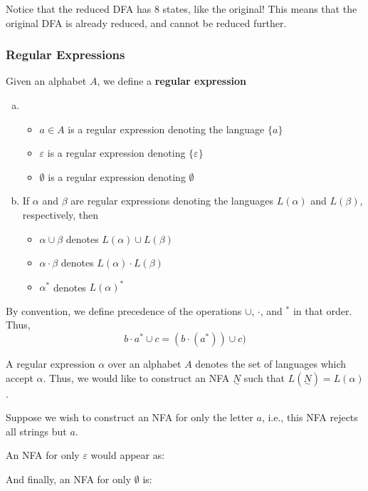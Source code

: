 Notice that the reduced DFA has 8 states, like the original! This means that the original DFA is already reduced, and cannot be reduced further.

\subsubsection{Regular Expressions}
\begin{definition}
Given an alphabet $A$, we define a \textbf{regular expression}
\begin{enumerate}[(a)]
    \item \begin{itemize}
        \item $a\in A$ is a regular expression denoting the language $\{a\}$
        \item $\varepsilon$ is a regular expression denoting $\{\varepsilon\}$
        \item $\emptyset$ is a regular expression denoting $\emptyset$
    \end{itemize}
    
    \item If $\alpha$ and $\beta$ are regular expressions denoting the languages $L(\alpha)$ and $L(\beta)$, respectively, then 
    \begin{itemize}
        \item $\alpha\cup\beta$ denotes $L(\alpha)\cup L(\beta)$
        \item $\alpha\cdot\beta$ denotes $L(\alpha)\cdot L(\beta)$
        \item $\alpha^*$ denotes $L(\alpha)^*$
    \end{itemize}
\end{enumerate}
\end{definition}

By convention, we define precedence of the operations $\cup$, $\cdot$, and $^*$ in that order. Thus, \[b\cdot a^*\cup c=(b\cdot(a^*))\cup c)\]

A regular expression $\alpha$ over an alphabet $A$ denotes the set of languages which accept $\alpha$. Thus, we would like to construct an NFA $\underset{\sim}{N}$ such that $L(\underset{\sim}{N})=L(\alpha)$.

Suppose we wish to construct an NFA for only the letter $a$, i.e., this NFA rejects all strings but $a$. 

An NFA for only $\varepsilon$ would appear as:

And finally, an NFA for only $\emptyset$ is:

